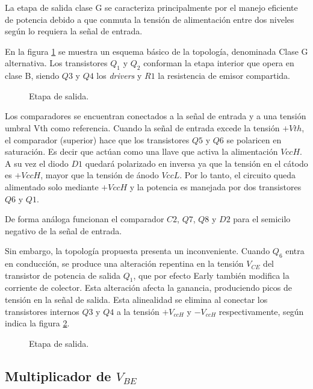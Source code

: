 	La etapa de salida clase G se caracteriza principalmente por el manejo eficiente de potencia debido a que conmuta la tensión de alimentación entre dos niveles según lo requiera la señal de entrada.

	En la figura \ref{fig.salida} se muestra un esquema básico de la topología, denominada Clase G alternativa.  Los transistores $Q_1$ y $Q_2$ conforman la etapa interior que opera en clase B, siendo $Q3$ y $Q4$ los \textit{drivers} y $R1$ la resistencia de emisor compartida. 

	\begin{figure}[H]
		\centering
		\scalebox{0.5}{}
		\caption{Etapa de salida.}
		\label{fig.salida}
	\end{figure}

	Los comparadores se encuentran conectados a la señal de entrada y a una tensión umbral Vth como referencia. Cuando la señal de entrada excede la tensión $+Vth$, el comparador (superior) hace que los transistores $Q5$ y $Q6$ se polaricen en saturación. Es decir que actúan como una llave que activa la alimentación $VccH$. A su vez el diodo $D1$ quedará polarizado en inversa ya que la tensión en el cátodo es $+VccH$, mayor que la tensión de ánodo $VccL$. Por lo tanto, el circuito queda alimentado solo mediante $+VccH$ y la potencia es manejada por dos transistores $Q6$ y $Q1$.

	De forma análoga funcionan el comparador $C2$, $Q7$, $Q8$ y $D2$ para el semicilo negativo de la señal de entrada.

	Sin embargo, la topología propuesta presenta un inconveniente. Cuando $Q_6$ entra en conducción, se produce una alteración repentina en la tensión $V_{CE}$ del transistor de potencia de salida $Q_1$, que por efecto Early también modifica la corriente de colector. Esta alteración afecta la ganancia, produciendo picos de tensión en la señal de salida. Esta alinealidad se elimina al conectar los transistores internos $Q3$ y $Q4$ a la tensión $+V_{ccH}$ y $-V_{ccH}$ respectivamente, según indica la figura \ref{fig.salida_2}.

	\begin{figure}[H]
		\centering
		\scalebox{0.5}{}
		\caption{Etapa de salida.}
		\label{fig.salida_2}
	\end{figure}
	
\subsection{Multiplicador de $V_{BE}$}

